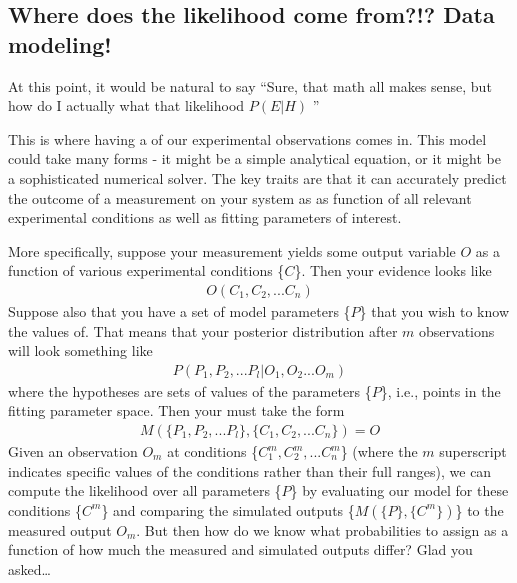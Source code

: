 \documentclass[letterpaper,10pt,english]{sphinxmanual}
\begin{document}
\subsection{Where does the likelihood come from?!? Data modeling!}
\label{\detokenize{bayesics:where-does-the-likelihood-come-from-data-modeling}}
At this point, it would be natural to say “Sure, that math all makes sense, but how do I actually  what that likelihood \(P(E|H)\) ”

This is where having a  of our experimental observations comes in. This model could take many forms - it might be a simple analytical equation, or it might be a sophisticated numerical solver. The key traits are that it can accurately predict the outcome of a measurement on your system as as function of all relevant experimental conditions as well as fitting parameters of interest.

More specifically, suppose your measurement yields some output variable \(O\) as a function of various experimental conditions \{\(C\)\}. Then your evidence looks like
\begin{equation}\label{equation:bayesics:bayesics:6}
\begin{split}O(C_1, C_2,...C_n)\end{split}
\end{equation}
Suppose also that you have a set of model parameters \{\(P\)\} that you wish to know the values of. That means that your posterior distribution after \(m\) observations will look something like
\begin{equation}\label{equation:bayesics:bayesics:7}
\begin{split}P(P_1, P_2,...P_l|O_1,O_2...O_m)\end{split}
\end{equation}
where the hypotheses are sets of values of the parameters \{\(P\)\}, i.e., points in the fitting parameter space. Then your  must take the form
\begin{equation}\label{equation:bayesics:bayesics:8}
\begin{split}M(\{P_1, P_2,...P_l\},\{C_1, C_2,...C_n\}) = O\end{split}
\end{equation}
Given an observation \(O_m\) at conditions \{\(C_1^m,C_2^m,...C_n^m\)\} (where the \(m\) superscript indicates specific values of the conditions rather than their full ranges), we can compute the likelihood over all parameters \{\(P\)\} by evaluating our model for these conditions \{\(C^m\)\} and comparing the simulated outputs \{\(M(\{P\},\{C^m\})\)\} to the measured output \(O_m\). But then how do we know what probabilities to assign as a function of how much the measured and simulated outputs differ? Glad you asked…
\end{document}
